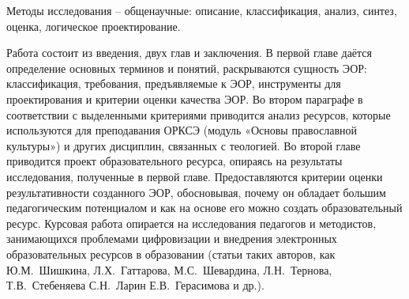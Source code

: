 Методы исследования – общенаучные: описание, классификация, анализ, синтез, оценка, логическое проектирование.

Работа состоит из введения, двух глав и заключения. В первой главе даётся определение основных терминов и понятий, раскрываются сущность ЭОР: классификация, требования, предъявляемые к ЭОР, инструменты для проектирования и критерии оценки качества ЭОР.
Во втором параграфе в соответствии с выделенными критериями приводится анализ ресурсов, которые используются для преподавания ОРКСЭ (модуль «Основы православной культуры») и других дисциплин, связанных с теологией. Во второй главе приводится проект образовательного ресурса, опираясь на результаты исследования, полученные в первой главе.
Предоставляются критерии оценки результативности созданного ЭОР, обосновывая, почему он обладает большим педагогическим потенциалом и как на основе его можно создать образовательный ресурс.
Курсовая работа опирается на исследования педагогов и методистов, занимающихся проблемами цифровизации и внедрения электронных образовательных ресурсов в образовании (статьи таких авторов, как Ю.М.~Шишкина, Л.Х.~Гаттарова, М.С.~Шевардина, Л.Н.~Тернова, Т.В.~Стебеняева С.Н.~Ларин Е.В.~Герасимова и др.).
